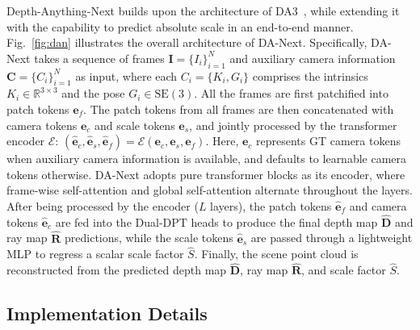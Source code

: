 \documentclass{llmxive}
\providecommand{\ours}{DA-Next\xspace}
\begin{document}
Depth-Anything-Next builds upon the architecture of DA3~\citep{lin2025depth}, while extending it with the capability to predict absolute scale in an end-to-end manner. 
%
Fig.~\ref{fig:dan} illustrates the overall architecture of \ours.
%
Specifically, \ours takes a sequence of frames $\mathbf{I} = \{I_i\}^N_{i=1}$ and auxiliary camera information $\mathbf{C} = \{C_i\}^N_{i=1}$ as input, where each $C_i=\{K_i,G_i\}$ comprises the intrinsics $K_i\in \mathbb{R}^{3\times 3}$ and the pose $G_i\in\mathrm{SE}(3)$.
%
All the frames are first patchified into patch tokens $\mathbf{e}_f$. 
%
The patch tokens from all frames are then concatenated with camera tokens $\mathbf{e}_c$ and scale tokens $\mathbf{e}_s$, and jointly processed by the transformer encoder 
$\mathcal{E}$:
%
$
(\hat{\mathbf{e}}_c,\hat{\mathbf{e}}_s,\hat{\mathbf{e}}_f)=\mathcal{E}(\mathbf{e}_c,\mathbf{e}_s,\mathbf{e}_f).
$
Here, $\mathbf{e}_c$ represents GT camera tokens when auxiliary camera information is available, and defaults to learnable camera tokens otherwise.
%
\ours adopts pure transformer blocks as its encoder, where frame-wise self-attention and global self-attention alternate throughout the layers.
%
After being processed by the encoder ($L$ layers), the patch tokens $\hat{\mathbf{e}}_f$ and camera tokens $\hat{\mathbf{e}}_c$ are fed into the Dual-DPT heads to produce the final depth map $\hat{\mathbf{D}}$ and ray map $\hat{\mathbf{R}}$ predictions, while the scale tokens $\hat{\mathbf{e}}_s$ are passed through a lightweight MLP to regress a scalar scale factor $\hat{S}$.
%
Finally, the scene point cloud is reconstructed from the predicted depth map $\hat{\mathbf{D}}$, ray map $\hat{\mathbf{R}}$, and scale factor $\hat{S}$.
%



\subsection{Implementation Details}
\end{document}
